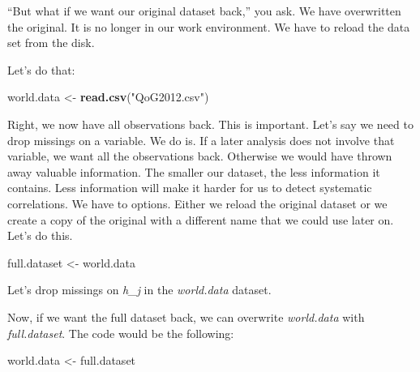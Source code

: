 \documentclass[]{article}
\newenvironment{Shaded}{\begin{snugshade}}{\end{snugshade}}
\newcommand{\KeywordTok}[1]{\textcolor[rgb]{0.13,0.29,0.53}{\textbf{#1}}}
\newcommand{\StringTok}[1]{\textcolor[rgb]{0.31,0.60,0.02}{#1}}
\newcommand{\OperatorTok}[1]{\textcolor[rgb]{0.81,0.36,0.00}{\textbf{#1}}}
\newcommand{\NormalTok}[1]{#1}
\theoremstyle{definition}
\theoremstyle{definition}
\theoremstyle{definition}
\theoremstyle{remark}
\begin{document}
``But what if we want our original dataset back,'' you ask. We have
overwritten the original. It is no longer in our work environment. We
have to reload the data set from the disk.

Let's do that:

\begin{Shaded}
\begin{Highlighting}[]
\NormalTok{world.data <-}\StringTok{ }\KeywordTok{read.csv}\NormalTok{(}\StringTok{"QoG2012.csv"}\NormalTok{)}
\end{Highlighting}
\end{Shaded}

Right, we now have all observations back. This is important. Let's say
we need to drop missings on a variable. We do is. If a later analysis
does not involve that variable, we want all the observations back.
Otherwise we would have thrown away valuable information. The smaller
our dataset, the less information it contains. Less information will
make it harder for us to detect systematic correlations. We have to
options. Either we reload the original dataset or we create a copy of
the original with a different name that we could use later on. Let's do
this.

\begin{Shaded}
\begin{Highlighting}[]
\NormalTok{full.dataset <-}\StringTok{ }\NormalTok{world.data}
\end{Highlighting}
\end{Shaded}

Let's drop missings on \emph{h\_j} in the \emph{world.data} dataset.

\begin{Shaded}
\end{Shaded}

Now, if we want the full dataset back, we can overwrite
\emph{world.data} with \emph{full.dataset}. The code would be the
following:

\begin{Shaded}
\begin{Highlighting}[]
\NormalTok{world.data <-}\StringTok{ }\NormalTok{full.dataset}
\end{Highlighting}
\end{Shaded}
\end{document}
